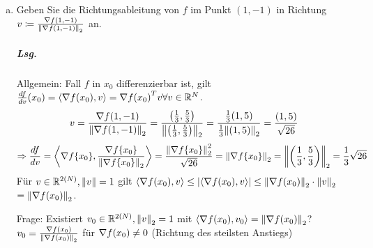 \documentclass{scrreprt}
\newcommand\skalprod[1]{\left\langle #1 \right\rangle}
\begin{document}
\begin{enumerate}[a)]
 \newpage
\item Geben Sie die Richtungsableitung von $f$ im Punkt $(1, -1)$ in Richtung
  $v \coloneqq \frac{\nabla f(1, -1)}{\norm{\nabla f(1, -1)}_2}$ an.
  \subparagraph{Lsg.} Allgemein: Fall $f$ in $x_0$ differenzierbar ist, gilt
  $\frac{df}{dv} (x_0) = \skalprod{\nabla f\qty(x_0), v} = \nabla f\qty(x_0)^T v \forall v \in \mathbb{R}^N$.
  \[
    v = \frac{\nabla f(1, -1)}{\norm{\nabla f(1, -1)}_2}
    = \frac{\qty(\frac{1}{3}, \frac{5}{3})}{\norm{\qty(\frac{1}{3}, \frac{5}{3})}_2}
    = \frac{\frac{1}{3}(1,5)}{\frac{1}{3} \norm{(1, 5)}_2} = \frac{(1, 5)}{\sqrt{26}}
  \]
  \[
    \Rightarrow \frac{df}{dv} = \skalprod{\nabla f\qty{x_0}, \frac{\nabla f\qty{x_0}}{\norm{\nabla f\qty{x_0}}_2}}
    = \frac{\norm{\nabla f\qty{x_0}}_2^2}{\sqrt{26}}
    = \norm{\nabla f\qty{x_0}}_2 = \norm{\qty(\frac{1}{3}, \frac{5}{3})}_2
    = \frac{1}{3}\sqrt{26}
  \]
  Für $v \in \mathbb{R}^{2(N)}, \norm{v} = 1$ gilt
  $\skalprod{\nabla f\qty(x_0), v} \leq \abs{\skalprod{\nabla f\qty(x_0), v}} \leq \norm{\nabla f\qty(x_0)}_2 \cdot \norm{v}_2$
  $= \norm{\nabla f\qty(x_0)}_2$.

  Frage: Existiert $v_0 \in \mathbb{R}^{2(N)}, \norm{v}_2 = 1$ mit
  $\skalprod{\nabla f\qty(x_0), v_0} = \norm{\nabla f\qty(x_0)}_2$?
  $v_0 = \frac{\nabla f\qty(x_0)}{\norm{\nabla f\qty(x_0)}_2}$ für $\nabla f\qty(x_0) \ne 0$
  (Richtung des steilsten Anstiegs)
\end{enumerate}
\end{document}
